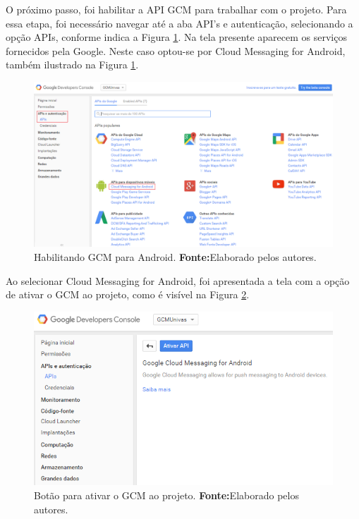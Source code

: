 	\pagebreak
	
	
	\par O próximo passo, foi habilitar a API GCM para trabalhar com o projeto.
Para essa etapa, foi necessário navegar até a aba API's e autenticação,
selecionando a opção APIs, conforme indica a Figura \ref{fig:gcm4}. Na tela
presente aparecem os serviços fornecidos pela Google. Neste caso optou-se por
Cloud Messaging for Android, também ilustrado na Figura \ref{fig:gcm4}.
	
	\begin{figure}[h!] 
		\centerline{\includegraphics[scale=0.4]{./imagens/2_q_metodologico/4_procedimentos_resultados/41_gcm/gcm4.png}}
		\caption[Habilitando GCM para Android]{Habilitando GCM para Android.
		\textbf{Fonte:}Elaborado pelos autores.}
		\label{fig:gcm4}
	\end{figure}
	
	\pagebreak
	
	\par Ao selecionar Cloud Messaging for Android, foi apresentada a tela com a
opção de ativar o GCM ao projeto, como é visível na Figura \ref{fig:gcm5}.
	
	\begin{figure}[h!] 
		\centerline{\includegraphics[scale=0.75]{./imagens/2_q_metodologico/4_procedimentos_resultados/41_gcm/gcm5.png}}
		\caption[Botão para ativar o GCM ao projeto]{Botão para ativar o GCM ao projeto.
		\textbf{Fonte:}Elaborado pelos autores.}
		\label{fig:gcm5}
	\end{figure}
	
